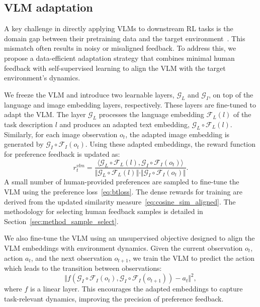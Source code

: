\subsection{VLM adaptation} \label{sec:method_vlm_adapt}
A key challenge in directly applying VLMs to downstream RL tasks is the domain gap between their pretraining data and the target environment~\cite{raychaudhuri2021cross,fu2024furl}. 
This mismatch often results in noisy or misaligned feedback. 
To address this, we propose a data-efficient adaptation strategy that combines minimal human feedback with self-supervised learning to align the VLM with the target environment's dynamics.

We freeze the VLM and introduce two learnable layers, $\mathcal{G}_L$ and $\mathcal{G}_I$, on top of the language and image embedding layers, respectively. 
These layers are fine-tuned to adapt the VLM. 
The layer $\mathcal{G}_L$ processes the language embedding $\mathcal{F}_L(l)$ of the task description $l$ and produces an adapted text embedding, $\mathcal{G}_L\circ\mathcal{F}_L(l)$. 
Similarly, for each image observation $o_t$, the adapted image embedding is generated by $\mathcal{G}_I\circ\mathcal{F}_I(o_t)$. 
Using these adapted embeddings, the reward function for preference feedback is updated as: 
\begin{equation} \label{eq:cosine_sim_aligned} 
    r^{vlm}_t = \frac{\langle \mathcal{G}_L\circ\mathcal{F}_L(l), \mathcal{G}_I\circ\mathcal{F}_I(o_t) \rangle}{\Vert \mathcal{G}_L\circ\mathcal{F}_L(l) \Vert \cdot \Vert \mathcal{G}_I\circ\mathcal{F}_I(o_t) \Vert}. 
\end{equation}
A small number of human-provided preferences are sampled to fine-tune the VLM using the preference loss~\eqref{eq:btloss}. 
The dense rewards for training are derived from the updated similarity measure~\eqref{eq:cosine_sim_aligned}. 
The methodology for selecting human feedback samples is detailed in Section~\ref{sec:method_sample_select}.

We also fine-tune the VLM using an unsupervised objective designed to align the VLM embeddings with environment dynamics. 
Given the current observation $o_t$, action $a_t$, and the next observation $o_{t+1}$, we train the VLM to predict the action which leads to the transition between observations: 
\begin{equation} \label{eq:inv_loss} 
    \Vert f\left(\mathcal{G}_I\circ\mathcal{F}_I(o_t), \mathcal{G}_I\circ\mathcal{F}_I(o_{t+1})\right) - a_t \Vert^2, 
\end{equation} 
where $f$ is a linear layer. 
This encourages the adapted embeddings to capture task-relevant dynamics, improving the precision of preference feedback.

